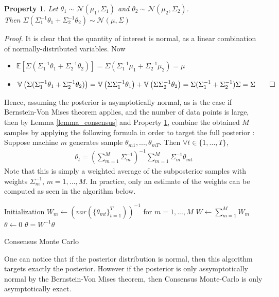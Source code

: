 \documentclass[11pt,a4paper]{report}\usepackage[]{graphicx}\usepackage[]{color}
\newtheorem{property}{Property}[section]
\begin{document}
\begin{property}
\label{eq:consensus3}
Let $\theta_1\sim\mathcal N(\mu_1,\Sigma_1)$ and $\theta_2\sim\mathcal N(\mu_2,\Sigma_2)$.\\
Then $\Sigma(\Sigma_1^{-1}\theta_1+\Sigma_2^{-1}\theta_2)\sim\mathcal N(\mu,\Sigma)$
  \end{property} 
\textit{Proof.} It is clear that the quantity of interest is normal, as a linear combination of normally-distributed variables. Now
\begin{itemize}

\item $\mathbb E[\Sigma(\Sigma_1^{-1}\theta_1+\Sigma_2^{-1}\theta_2)]=\Sigma(\Sigma_1^{-1}\mu_1+\Sigma_2^{-1}\mu_2)=\mu$
  \item $\mathbb{V}\left(\Sigma(\Sigma_1^{-1}\theta_1+\Sigma_2^{-1}\theta_2)\right)=\mathbb{V}\left(\Sigma\Sigma_1^{-1}\theta_1\right)+\mathbb{V}\left(\Sigma\Sigma_2^{-1}\theta_2\right)=\Sigma(\Sigma_1^{-1}+\Sigma_2^{-1})\Sigma=\Sigma\qed$
  \end{itemize}

Hence, assuming the posterior is asymptotically normal, as is the case if Bernstein-Von Mises theorem applies, and the number of data points is large, then by Lemma \ref{lemma_consensus} and Property \ref{eq:consensus3}, \cite{scott2016bayes} combine the obtained $M$ samples by applying the following formula in order to target the full posterior : \\
Suppose machine $m$ generates sample $\theta_{m1},...,\theta_{mT}$. Then $\forall t\in\{1,...,T\}$,
\begin{align}
\label{eq:consensus4}
\theta_t=\left(\sum_{m=1}^M\Sigma_m^{-1}\right)^{-1}\sum_{m=1}^M\Sigma_m^{-1}\theta_{mt}
\end{align}
Note that this is simply a weighted average of the subposterior samples with weights $\Sigma_m^{-1}$, $m=1,...,M$. In practice, only an estimate of the weights can be computed as seen in the algorithm below.

\begin{algorithm}[H]
\label{algo:2}
Initialization\;
$W_m\leftarrow \left(var(\{\theta_{mt}\}_{t=1}^T)\right)^{-1}$ for $m=1,...,M$\;
$W\leftarrow \sum_{m=1}^M W_m$\;
$\theta\leftarrow 0$\;
$\theta=W^{-1}\theta$
  \caption{Consensus Monte Carlo}
\end{algorithm}
One can notice that if the posterior distribution is normal, then this algorithm targets exactly the posterior. However if the posterior is only assymptotically normal by the Bernstein-Von Mises theorem, then Consensus Monte-Carlo is only asymptotically exact.
\newpage
\end{document}
